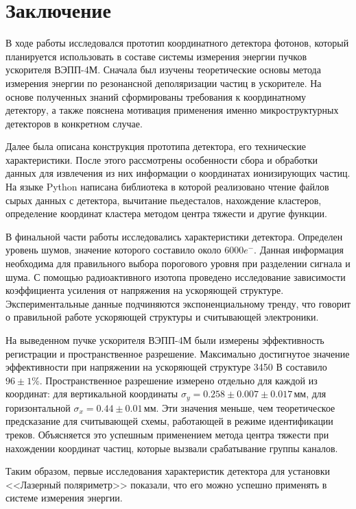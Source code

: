 \chapter*{Заключение}
В ходе работы исследовался прототип координатного детектора фотонов, который планируется использовать в составе системы измерения энергии пучков ускорителя ВЭПП-4М. Сначала был изучены теоретические основы метода измерения энергии по резонансной деполяризации частиц в ускорителе. На основе полученных знаний сформированы требования к координатному детектору, а также  пояснена мотивация применения именно микроструктурных детекторов в конкретном случае. 
\par Далее была описана конструкция прототипа детектора, его технические характеристики. После этого рассмотрены особенности сбора и обработки данных для извлечения из них информации о координатах ионизирующих частиц. На языке Python написана библиотека в которой реализовано чтение файлов сырых данных с детектора, вычитание пьедесталов, нахождение кластеров, определение координат кластера методом центра тяжести и другие функции. 
\par В финальной части работы исследовались характеристики детектора. Определен уровень шумов, значение которого составило около $6000 e^-$. Данная информация необходима для правильного выбора порогового уровня при разделении сигнала и шума. С помощью радиоактивного изотопа проведено исследование зависимости коэффициента усиления от напряжения на ускоряющей структуре. Экспериментальные данные подчиняются экспоненциальному тренду, что говорит о правильной работе ускоряющей структуры и считывающей электроники. 
\par На выведенном пучке ускорителя ВЭПП-4М были измерены эффективность регистрации и пространственное разрешение. Максимально достигнутое значение эффективности при напряжении на ускоряющей структуре 3450 В составило $96 \pm 1\%$. Пространственное разрешение измерено отдельно для каждой из координат: для вертикальной координаты $\sigma_y = 0.258\pm0.007\pm0.017$\,мм, для горизонтальной $\sigma_x = 0.44\pm0.01$\,мм. Эти значения меньше, чем теоретическое предсказание для считывающей схемы, работающей в режиме идентификации треков. Объясняется это успешным применением метода центра тяжести при нахождении координат частиц, которые вызвали срабатывание группы каналов. 
\par Таким образом, первые исследования характеристик детектора для установки <<Лазерный поляриметр>> показали, что его можно успешно применять в системе измерения энергии. 